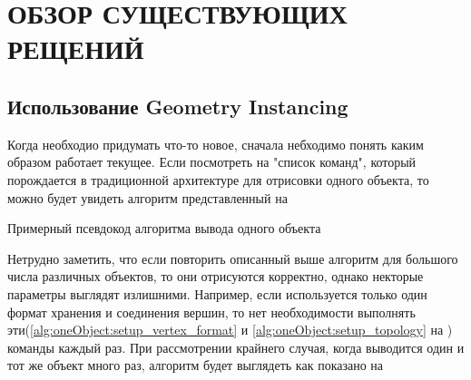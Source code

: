 \chapter{ОБЗОР СУЩЕСТВУЮЩИХ РЕЩЕНИЙ} \label{ch2}
\section{Использование Geometry Instancing} \label{ch2:instancing} %
	Когда необходио придумать что-то новое, сначала небходимо понять каким образом работает текущее. Если посмотреть на "список команд", который порождается в традиционной архитектуре для отрисовки одного объекта, то можно будет увидеть алгоритм представленный на 
	\begin{algorithm} %
		\nonl{}
		\caption{Примерный псевдокод алгоритма вывода одного объекта}\label{alg:oneObject}
	\end{algorithm}
	\FloatBarrier
	
	Нетрудно заметить, что если повторить описанный выше алгоритм для большого числа различных объектов, то они отрисуются корректно, однако некторые параметры выглядят излишними. Например, если используется только один формат хранения и соединения вершин, то нет необходимости выполнять эти(\ref{alg:oneObject:setup_vertex_format} и  \ref{alg:oneObject:setup_topology} на ) команды каждый раз. При рассмотрении крайнего случая, когда выводится один и тот же объект много раз, алгоритм будет выглядеть как показано на 
	
